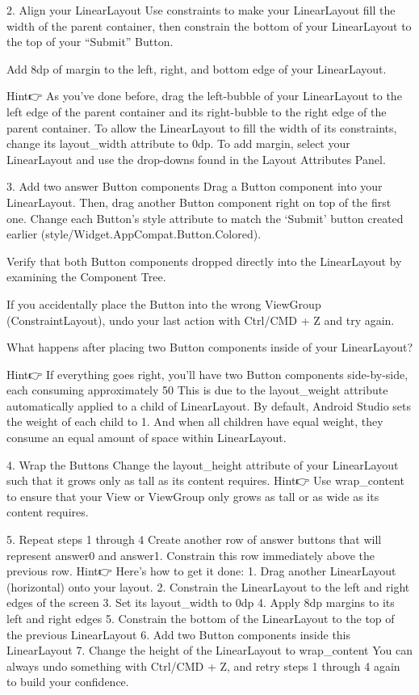     2. Align your LinearLayout
        Use constraints to make your LinearLayout fill the width of the parent container, then constrain the bottom of your LinearLayout to the top of your “Submit” Button.

        Add 8dp of margin to the left, right, and bottom edge of your LinearLayout.

        Hint👉 As you've done before, drag the left-bubble of your LinearLayout to the left edge of the parent container and its right-bubble to the right edge of the parent container.
        To allow the LinearLayout to fill the width of its constraints, change its layout_width attribute to 0dp.
        To add margin, select your LinearLayout and use the drop-downs found in the Layout Attributes Panel.

    3. Add two answer Button components
        Drag a Button component into your LinearLayout. Then, drag another Button component right on top of the first one. Change each Button’s style attribute to match the ‘Submit’ button created earlier (style/Widget.AppCompat.Button.Colored).

        Verify that both Button components dropped directly into the LinearLayout by examining the Component Tree.

        If you accidentally place the Button into the wrong ViewGroup (ConstraintLayout), undo your last action with Ctrl/CMD + Z and try again.

        What happens after placing two Button components inside of your LinearLayout?

        Hint👉 If everything goes right, you'll have two Button components side-by-side, each consuming approximately 50%
        This is due to the layout_weight attribute automatically applied to a child of LinearLayout.
        By default, Android Studio sets the weight of each child to 1. And when all children have equal weight, they consume an equal amount of space within LinearLayout.

    4. Wrap the Buttons
        Change the layout_height attribute of your LinearLayout such that it grows only as tall as its content requires.
        Hint👉 Use wrap_content to ensure that your View or ViewGroup only grows as tall or as wide as its content requires.

    5. Repeat steps 1 through 4
        Create another row of answer buttons that will represent answer0 and answer1. Constrain this row immediately above the previous row.
        Hint👉 Here's how to get it done:
            1. Drag another LinearLayout (horizontal) onto your layout.
            2. Constrain the LinearLayout to the left and right edges of the screen
            3. Set its layout_width to 0dp
            4. Apply 8dp margins to its left and right edges
            5. Constrain the bottom of the LinearLayout to the top of the previous LinearLayout
            6. Add two Button components inside this LinearLayout
            7. Change the height of the LinearLayout to wrap_content
        You can always undo something with Ctrl/CMD + Z, and retry steps 1 through 4 again to build your confidence.

